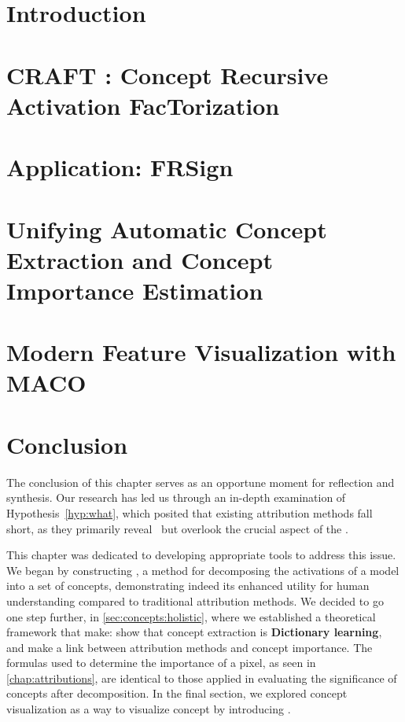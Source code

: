 \section{Introduction}

\clearpage

\section{CRAFT : Concept Recursive Activation FacTorization}
\label{sec:concepts:craft}

\clearpage

\section{Application: FRSign}
\label{sec:concepts:frsign}

\clearpage

\section{Unifying Automatic Concept Extraction and Concept Importance Estimation}
\label{sec:concepts:holistic}

\clearpage
  
\section{Modern Feature Visualization with MACO}
\label{sec:concepts:maco}

\clearpage

\section{Conclusion}

The conclusion of this chapter serves as an opportune moment for reflection and synthesis. Our research has led us through an in-depth examination of Hypothesis~\ref{hyp:what}, which posited that existing attribution methods fall short, as they primarily reveal ~\where but overlook the crucial aspect of the \what.

This chapter was dedicated to developing appropriate tools to address this issue. We began by constructing \craft, a method for decomposing the activations of a model into a set of concepts, demonstrating indeed its enhanced utility for human understanding compared to traditional attribution methods.
We decided to go one step further, in \autoref{sec:concepts:holistic}, where we established a theoretical framework that make:  show that concept extraction is \textbf{Dictionary learning}, and  make a link between attribution methods and concept importance. The formulas used to determine the importance of a pixel, as seen in \autoref{chap:attributions}, are identical to those applied in evaluating the significance of concepts after decomposition. In the final section, we explored concept visualization as a way to visualize concept by introducing \maco. 

